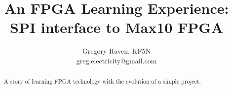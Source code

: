 \documentclass[letterpaper,12pt]{article}
\title{An FPGA Learning Experience:  SPI interface to Max10 FPGA}
\author{Gregory Raven, KF5N \\ greg.electricity@gmail.com}
\begin{document}
	
		\maketitle
	
	\begin{abstract}
		A story of learning FPGA technology with the evolution of a simple project.
	\end{abstract}








\end{document}
